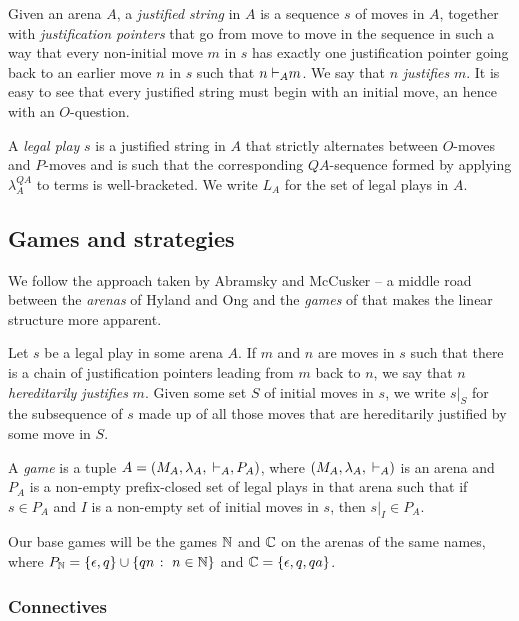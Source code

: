\documentclass[sigplan,10pt,review]{acmart}\settopmatter{printfolios=true,printccs=false,printacmref=false}
\begin{document}
Given an arena $A$, a \emph{justified string} in $A$ is a sequence $s$ of moves in $A$, together with \emph{justification pointers} that go from move to move in the sequence in such a way that every non-initial move $m$ in $s$ has exactly one justification pointer going back to an earlier move $n$ in $s$ such that $n{\;\vdash}_A m$.  
We say that $n$ \emph{justifies} $m$.  
It is easy to see that every justified string must begin with an initial move, an hence with an $O$-question.  

A \emph{legal play} $s$ is a justified string in $A$ that strictly alternates between $O$-moves and $P$-moves and is such that the corresponding $QA$-sequence formed by applying $\lambda_A^{QA}$ to terms is well-bracketed.
We write $L_A$ for the set of legal plays in $A$.

\subsection{Games and strategies}

We follow the approach taken by Abramsky and McCusker \cite{SamsonGuyIAPassive} -- a middle road between the \emph{arenas} of Hyland and Ong and the \emph{games} of \cite{ajmPcf} that makes the linear structure more apparent.

Let $s$ be a legal play in some arena $A$.  
If $m$ and $n$ are moves in $s$ such that there is a chain of justification pointers leading from $m$ back to $n$, we say that $n$ \emph{hereditarily justifies} $m$.  
Given some set $S$ of initial moves in $s$, we write $s\vert_S$ for the subsequence of $s$ made up of all those moves that are hereditarily justified by some move in $S$.

A \emph{game} is a tuple $A=(M_A,\lambda_A,{\;\vdash}_A,P_A)$, where $(M_A,\lambda_A,{\;\vdash}_A)$ is an arena and $P_A$ is a non-empty prefix-closed set of legal plays in that arena such that if $s\in P_A$ and $I$ is a non-empty set of initial moves in $s$, then $s\vert_I\in P_A$.

Our base games will be the games $\mathbb{N}$ and $\mathbb{C}$ on the arenas of the same names, where $P_{\mathbb{N}}=\{\epsilon,q\}\cup\{qn\;\colon\; n\in\mathbb{N}\}$ and $\mathbb{C} = \{\epsilon,q,qa\}$.  

\subsubsection{Connectives}
\end{document}
